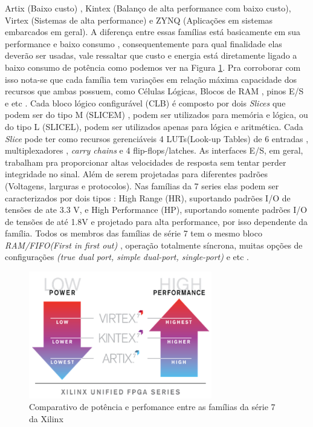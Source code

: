 Artix (Baixo custo) , Kintex (Balanço de alta performance com baixo custo), Virtex (Sistemas de alta performance) e ZYNQ (Aplicações em sistemas embarcados em geral).
A diferença entre essas famílias está basicamente em sua performance e baixo consumo , consequentemente para qual finalidade elas deverão ser usadas, vale ressaltar que custo e energia está diretamente ligado a baixo consumo de potência como podemos ver na Figura \ref{comparative}. Pra corroborar com isso nota-se que cada família tem variações em relação máxima capacidade dos recursos que ambas possuem, como Células Lógicas, Blocos de RAM , pinos E/S e etc .
Cada bloco lógico configurável (CLB) é composto por dois \textit{Slices} que podem ser do tipo M (SLICEM) , podem ser utilizados para memória e lógica, ou do tipo L (SLICEL), podem ser utilizados apenas para lógica e aritmética. 
Cada \textit{Slice} pode ter como recursos gerenciáveis 4 LUTs(Look-up Tables) de 6 entradas , multiplexadores , \textit{carry chains} e 4 flip-flops/latches.
As interfaces E/S, em geral, trabalham pra proporcionar altas velocidades de resposta sem tentar perder integridade no sinal. Além de serem projetadas para diferentes padrões (Voltagens, larguras e protocolos). Nas famílias da 7 series elas podem ser caracterizados por dois tipos : High Range (HR), suportando padrões I/O de tensões de ate 3.3 V,  e High Performance (HP), suportando somente padrões I/O de tensões de até 1.8V e projetado para alta performance, por isso dependente da família.
Todos os membros das famílias de série 7 tem o mesmo bloco \textit{RAM/FIFO(First in first out)} , operação totalmente síncrona, muitas opções de configurações \textit{(true dual port, simple dual-port, single-port)} e etc \cite{demetrioarquitetura}. 

\begin{figure}[H]
	\centering
	\includegraphics[width=8cm]{figures/xi-lite-01.png}
	\caption{Comparativo de potência e perfomance entre as famílias da série 7 da Xilinx}
	\label{comparative}
\end{figure}
